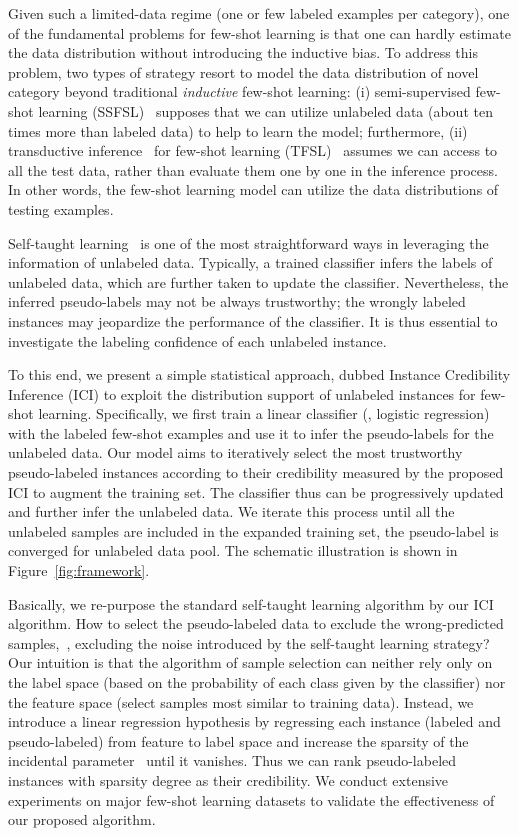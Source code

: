 \documentclass[10pt,letterpaper,twocolumn]{article}
\begin{document}
Given such a limited-data regime (one or few labeled examples per category), one of the fundamental problems for few-shot learning is that one can hardly estimate the data distribution without introducing the inductive bias.
To address this problem, 
two types of strategy resort to model the data distribution of novel category beyond traditional \emph{inductive} few-shot learning:
(i) semi-supervised few-shot learning (SSFSL)~\cite{liu2018learning,ren2018meta,sun2019learning} supposes that we can utilize 
unlabeled data (about ten times more than labeled data) to help to learn the 
model;
furthermore,
(ii) transductive inference~\cite{joachims1999transductive} for few-shot learning (TFSL)~\cite{liu2018learning,qiao2019transductive} assumes we can access to all the test data, rather than evaluate them one by one in the inference process. 
In other words, the few-shot learning model can utilize the data distributions of testing examples. 

Self-taught learning~\cite{self-taught-learning} is one of the most straightforward ways in leveraging the information of unlabeled data. Typically, a trained classifier infers the labels of unlabeled data, which are further taken to update the classifier. 
Nevertheless, the inferred pseudo-labels may not be always trustworthy; the wrongly labeled instances may jeopardize the performance of the classifier.
It is thus essential to investigate the labeling confidence of each unlabeled instance.

To this end, we present a simple statistical approach, dubbed Instance Credibility Inference (ICI) to exploit the distribution support of unlabeled instances for few-shot learning. 
Specifically, we first train a linear classifier (\eg, logistic regression) with the labeled few-shot examples and use it to infer the pseudo-labels for the unlabeled data.
Our model aims to iteratively select the most trustworthy pseudo-labeled instances according to their credibility measured by the proposed ICI to augment the training set. 
The classifier thus can be progressively updated and further infer the unlabeled data.
We iterate this process until all the unlabeled samples are included in the expanded training set, \ie the pseudo-label is converged for unlabeled data pool.
The schematic illustration is shown in Figure~\ref{fig:framework}. 

Basically, we re-purpose the standard self-taught learning algorithm by our ICI algorithm.
How to select the pseudo-labeled data to exclude the wrong-predicted samples,~\ie, excluding the noise introduced by the self-taught learning strategy?
Our intuition is that the algorithm of sample selection can neither rely only on the label space (\eg based on the probability of each class given by the classifier) nor the feature space (\eg select samples most similar to training data). 
Instead, 
we introduce a linear regression hypothesis by regressing each instance (labeled and pseudo-labeled) from feature to label space and increase the sparsity of the incidental parameter~\cite{fan2012partial} until it vanishes.
Thus we can rank pseudo-labeled instances with sparsity degree as their credibility.
We conduct extensive experiments on major few-shot learning datasets to validate the effectiveness of our proposed algorithm. 
\end{document}

